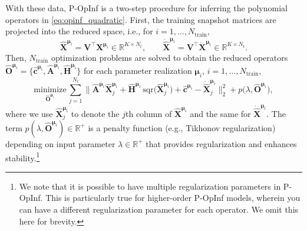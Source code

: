 \documentclass[3p,computermodern,11pt]{elsarticle}
\numberwithin{equation}{section}
\newcommand{\reducedOperatorLinear}{\hat{\mathbf{A}}}
\newcommand{\reducedOperatorQuadratic}{\hat{\mathbf{H}}}
\newcommand{\reducedOperatorConstant}{\hat{\mathbf{c}}}
\newcommand{\reducedOperatorInputs}{\hat{\mathbf{G}}}
\newcommand{\snapshotsInputs}{\mathbf{U}}
\newcommand{\snapshotsLhs}{\dot{\mathbf{X}}}
\newcommand{\reducedSnapshotsLhs}{\dot{\hat{\snapshotsState}}}
\newcommand{\penaltyFunction}{p}
\newcommand{\penaltyParameter}{\lambda}
\newcommand{\ops}{\hat{\boldsymbol O}}
\newcommand{\nt}{N_t}
\newcommand{\sqr}[1]{\mathrm{sqr}\big(#1 \big)}
\newcommand{\snapshotsState}{\mathbf{X}}
\newcommand{\reducedSnapshotsState}{\hat{\mathbf{X}}}
\newcommand{\romBasis}{\mathbf{V}}
\newcommand{\params}{\boldsymbol \mu}
\newcommand{\RR}[1]{\mathbb{R}^{#1}}
\newcommand{\romDim}{K}
\newcommand{\nTrain}{N_{\text{train}}}
\begin{document}
With these data, P-OpInf is a two-step procedure for inferring the polynomial operators in \eqref{eq:opinf_quadratic}.  First, the training snapshot matrices are projected into the reduced space, i.e., for $i=1,\ldots,\nTrain$, 
 $$\reducedSnapshotsState^{\params_i} = \romBasis^\intercal \snapshotsState^{\params_i} \in \RR{\romDim \times \nt}, \qquad \reducedSnapshotsLhs^{\params_i} = \romBasis^\intercal \snapshotsLhs^{\params_i} \in \RR{\romDim \times \nt}.$$
Then, $\nTrain$ optimization problems are solved to obtain the reduced operators $\ops^{\params_i} = \{\reducedOperatorConstant^{\params_i},\reducedOperatorLinear^{\params_i},\reducedOperatorQuadratic^{\params_i}\}$ for each parameter realization $\params_i$, $i=1,\ldots,\nTrain$,
\begin{equation}\label{eq:opinf_optimization}
\underset{\ops^{\params_i}}{\mathrm{minimize}}\, \sum_{j=1}^{\nt}\Big\| \reducedOperatorLinear^{\params_i} \reducedSnapshotsState^{\params_i}_j  + \reducedOperatorQuadratic^{\params_i}\, \sqr{ \reducedSnapshotsState^{\params_i}_j } + \reducedOperatorConstant^{\params_i} - \reducedSnapshotsLhs^{\params_i}_j \Big\|_2^2 + \penaltyFunction \big(\penaltyParameter,\ops^{\params_i} \big),
\end{equation}
where we use $\reducedSnapshotsState^{\params_i}_j$ to denote the $j$th column of $\reducedSnapshotsState^{\params_i}$ and the same for $\reducedSnapshotsLhs^{\params_i}$. The term $\penaltyFunction(\penaltyParameter,\ops^{\params_i}) \in \RR{+}$ is a penalty function (e.g., Tikhonov regularization) depending on input parameter $\penaltyParameter \in \RR{+}$ that provides regularization and enhances stability.\footnote{We note that it is possible to have multiple regularization parameters in P-OpInf. This is particularly true for higher-order P-OpInf models, wherein you can have a different regularization parameter for each operator. We omit this here for brevity.} 
\end{document}
